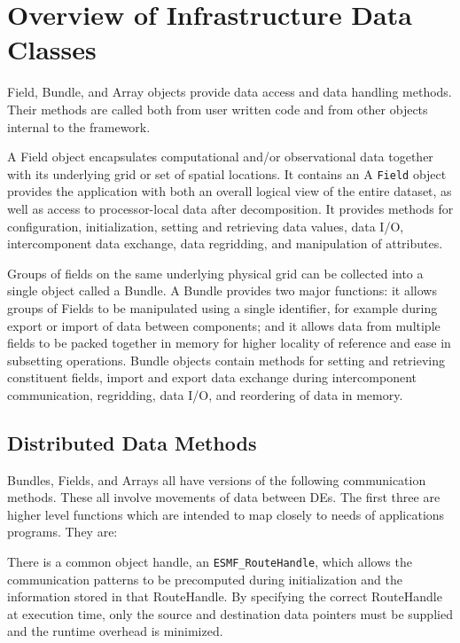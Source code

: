 
\section{Overview of Infrastructure Data Classes}

Field, Bundle, and Array objects provide data access and data 
handling methods.  Their methods are called both from user written
code and from other objects internal to the framework.

A Field object encapsulates computational and/or observational 
data together with its underlying grid or set of spatial locations.  
It contains an A {\tt Field} object provides the
application with both an overall logical view of the entire
dataset, as well as access to processor-local data after decomposition.
It provides methods for configuration, initialization, setting and
retrieving data values, data I/O, intercomponent data 
exchange, data regridding, and manipulation of attributes.

Groups of fields on the same underlying physical grid 
can be collected into a single object called a Bundle.  
A Bundle provides two major functions: it allows groups of 
Fields to be manipulated using a single identifier, for example during
export or import of data between components; and it allows
data from multiple fields to be packed together in memory 
for higher locality of reference and ease in subsetting operations.
Bundle objects contain methods for setting and retrieving constituent 
fields, import and export data exchange during intercomponent 
communication, regridding, data I/O, and reordering of data in memory.

\subsection{Distributed Data Methods}

Bundles, Fields, and Arrays all have versions of the following
communication methods.  These all involve movements of data between
DEs.  The first three are higher level functions which are intended to
map closely to needs of applications programs.  They are:

There is a common object handle, an {\tt ESMF\_RouteHandle}, which
allows the communication patterns to be precomputed during 
initialization and the information stored in that RouteHandle.
By specifying the correct RouteHandle at execution time, only
the source and destination data pointers must be supplied and the
runtime overhead is minimized.


